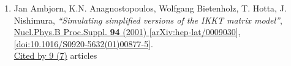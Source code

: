 \documentclass[a4paper,10pt]{article}
\begin{document}
\begin{enumerate}
\begin{enumerate}
\end{enumerate}
\item Jan Ambjorn, K.N. Anagnostopoulos, Wolfgang Bietenholz, T. Hotta, J. Nishimura, {\it ``Simulating simplified versions of the IKKT matrix model''}, \href{https://www.doi.org/10.1016/S0920-5632(01)00877-5}{Nucl.Phys.B Proc.Suppl. {\bf 94} (2001) } \href{https://arxiv.org/abs/hep-lat/0009030}{[arXiv:hep-lat/0009030]}, \href{https://www.doi.org/10.1016/S0920-5632(01)00877-5}{[doi:10.1016/S0920-5632(01)00877-5]}.
\\\href{https://inspirehep.net/literature/?q=refersto%3Arecid%3A534033}{Cited by 9 (7)} articles


\end{enumerate}
\end{document}
